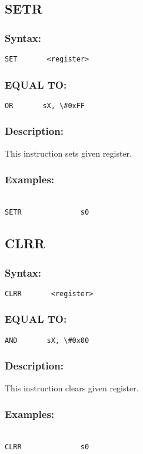     \subsection{SETR}
        \subsubsection{Syntax:}
            \verb'SET       <register>'

        \subsubsection{EQUAL TO:}
            \verb'OR       sX, \#0xFF'

        \subsubsection{Description:}
            This instruction sets given register.

        \subsubsection{Examples:}
        {
            ~\\
            \usecodefont
            \verb'SETR              s0'\\
        }

    \subsection{CLRR}
        \subsubsection{Syntax:}
            \verb'CLRR       <register>'

        \subsubsection{EQUAL TO:}
            \verb'AND       sX, \#0x00'

        \subsubsection{Description:}
            This instruction clears given register.

        \subsubsection{Examples:}
        {
            ~\\
            \usecodefont
            \verb'CLRR              s0'\\
        }

